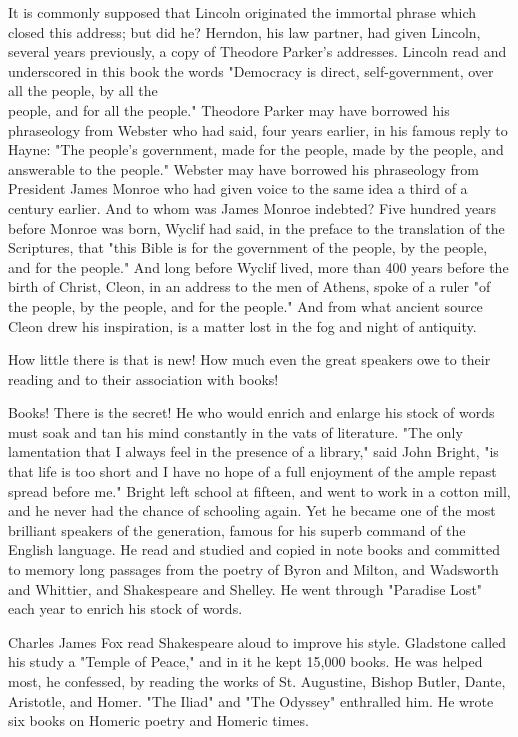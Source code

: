 \documentclass[10pt]{article}
\begin{document}
It is commonly supposed that Lincoln originated the immortal phrase which closed this address; but did he? Herndon, his law partner, had given Lincoln, several years previously, a copy of Theodore Parker's addresses. Lincoln read and underscored in this book the words "Democracy is direct, self-government, over all the people, by all the\\
people, and for all the people." Theodore Parker may have borrowed his phraseology from Webster who had said, four years earlier, in his famous reply to Hayne: "The people's government, made for the people, made by the people, and answerable to the people." Webster may have borrowed his phraseology from President James Monroe who had given voice to the same idea a third of a century earlier. And to whom was James Monroe indebted? Five hundred years before Monroe was born, Wyclif had said, in the preface to the translation of the Scriptures, that "this Bible is for the government of the people, by the people, and for the people." And long before Wyclif lived, more than 400 years before the birth of Christ, Cleon, in an address to the men of Athens, spoke of a ruler "of the people, by the people, and for the people." And from what ancient source Cleon drew his inspiration, is a matter lost in the fog and night of antiquity.

How little there is that is new! How much even the great speakers owe to their reading and to their association with books!

Books! There is the secret! He who would enrich and enlarge his stock of words must soak and tan his mind constantly in the vats of literature. "The only lamentation that I always feel in the presence of a library," said John Bright, "is that life is too short and I have no hope of a full enjoyment of the ample repast spread before me." Bright left school at fifteen, and went to work in a cotton mill, and he never had the chance of schooling again. Yet he became one of the most\\
brilliant speakers of the generation, famous for his superb command of the English language. He read and studied and copied in note books and committed to memory long passages from the poetry of Byron and Milton, and Wadsworth and Whittier, and Shakespeare and Shelley. He went through "Paradise Lost" each year to enrich his stock of words.

Charles James Fox read Shakespeare aloud to improve his style. Gladstone called his study a "Temple of Peace," and in it he kept 15,000 books. He was helped most, he confessed, by reading the works of St. Augustine, Bishop Butler, Dante, Aristotle, and Homer. "The Iliad" and "The Odyssey" enthralled him. He wrote six books on Homeric poetry and Homeric times.
\end{document}
